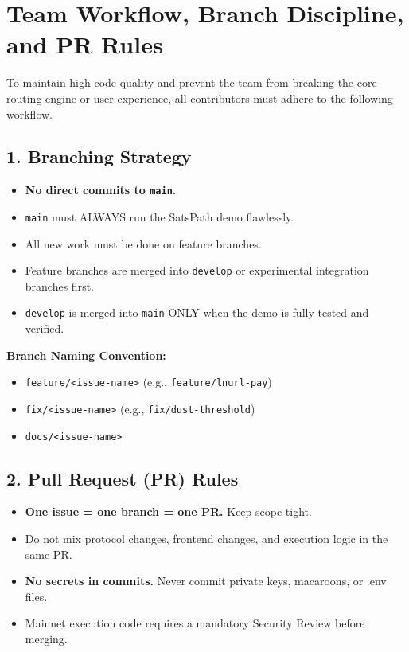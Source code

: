 \documentclass[
]{article}
\author{}
\date{}
\providecommand{\tightlist}{%
  \setlength{\itemsep}{0pt}\setlength{\parskip}{0pt}}
\begin{document}
\hypertarget{team-workflow-branch-discipline-and-pr-rules}{%
\section{Team Workflow, Branch Discipline, and PR
Rules}\label{team-workflow-branch-discipline-and-pr-rules}}

To maintain high code quality and prevent the team from breaking the
core routing engine or user experience, all contributors must adhere to
the following workflow.

\hypertarget{branching-strategy}{%
\subsection{1. Branching Strategy}\label{branching-strategy}}

\begin{itemize}
\tightlist
\item
  \textbf{No direct commits to \texttt{main}.}
\item
  \texttt{main} must ALWAYS run the SatsPath demo flawlessly.
\item
  All new work must be done on feature branches.
\item
  Feature branches are merged into \texttt{develop} or experimental
  integration branches first.
\item
  \texttt{develop} is merged into \texttt{main} ONLY when the demo is
  fully tested and verified.
\end{itemize}

\textbf{Branch Naming Convention:}

\begin{itemize}
\tightlist
\item
  \texttt{feature/\textless{}issue-name\textgreater{}} (e.g.,
  \texttt{feature/lnurl-pay})
\item
  \texttt{fix/\textless{}issue-name\textgreater{}} (e.g.,
  \texttt{fix/dust-threshold})
\item
  \texttt{docs/\textless{}issue-name\textgreater{}}
\end{itemize}

\hypertarget{pull-request-pr-rules}{%
\subsection{2. Pull Request (PR) Rules}\label{pull-request-pr-rules}}

\begin{itemize}
\tightlist
\item
  \textbf{One issue = one branch = one PR.} Keep scope tight.
\item
  Do not mix protocol changes, frontend changes, and execution logic in
  the same PR.
\item
  \textbf{No secrets in commits.} Never commit private keys, macaroons,
  or .env files.
\item
  Mainnet execution code requires a mandatory Security Review before
  merging.
\end{itemize}
\end{document}
